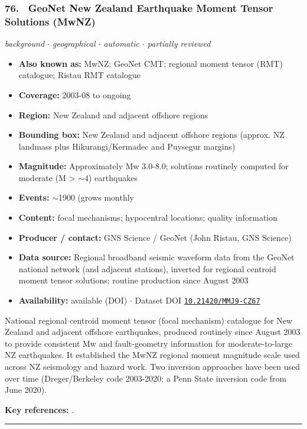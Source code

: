 \documentclass[10pt,a4paper]{article}
\newcommand{\catentryrule}{\par\vspace{3pt}\noindent\textcolor{rulegrey}{\rule{\linewidth}{0.3pt}}\par\vspace{5pt}}
\newcommand{\kv}[2]{\item \textbf{#1:} #2}
\begin{document}
\subsubsection*{\hypertarget{c:76}{76.}~ GeoNet New Zealand Earthquake Moment Tensor Solutions (MwNZ)}
{\small\itshape background $\cdot$ geographical $\cdot$ automatic $\cdot$ partially reviewed}\par\vspace{2pt}
\begin{itemize}[leftmargin=1.3em,itemsep=0.6pt,topsep=1pt,parsep=0pt]
\kv{Also known as}{MwNZ; GeoNet CMT; regional moment tensor (RMT) catalogue; Ristau RMT catalogue}
\kv{Coverage}{2003-08 to ongoing}
\kv{Region}{New Zealand and adjacent offshore regions}
\kv{Bounding box}{New Zealand and adjacent offshore regions (approx. NZ landmass plus Hikurangi/Kermadec and Puysegur margins)}
\kv{Magnitude}{Approximately Mw 3.0-8.0; solutions routinely computed for moderate (M \textgreater{} $\sim$4) earthquakes}
\kv{Events}{$\sim$1900 (grows monthly}
\kv{Content}{focal mechanisms; hypocentral locations; quality information}
\kv{Producer / contact}{GNS Science / GeoNet (John Ristau, GNS Science)}
\kv{Data source}{Regional broadband seismic waveform data from the GeoNet national network (and adjacent stations), inverted for regional centroid moment tensor solutions; routine production since August 2003}
\kv{Availability}{available (DOI) $\cdot$ Dataset DOI \href{https://doi.org/10.21420/MMJ9-CZ67}{\nolinkurl{10.21420/MMJ9-CZ67}}}
\end{itemize}
\par\vspace{2pt}National regional centroid moment tensor (focal mechanism) catalogue for New Zealand and adjacent offshore earthquakes, produced routinely since August 2003 to provide consistent Mw and fault-geometry information for moderate-to-large NZ earthquakes. It established the MwNZ regional moment magnitude scale used across NZ seismology and hazard work. Two inversion approaches have been used over time (Dreger/Berkeley code 2003-2020; a Penn State inversion code from June 2020).
\par\vspace{2pt}\textbf{Key references:} \cite{GNSScience2006,Ristau2008,Ristau2009}.
\catentryrule
\end{document}
